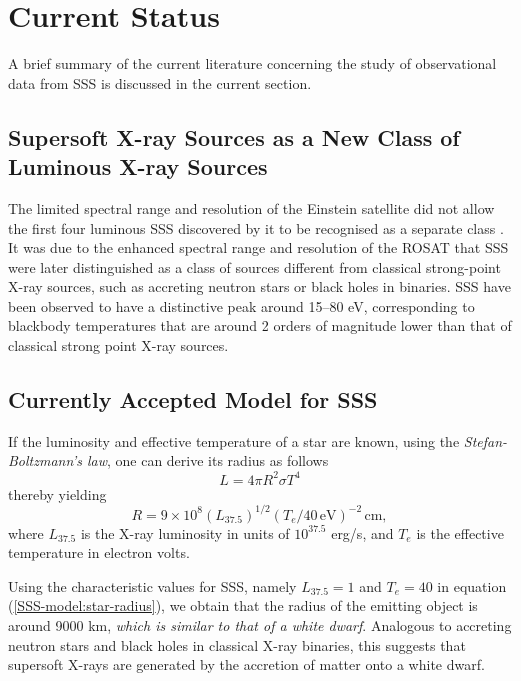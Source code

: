     \section{Current Status} \label{introduction:current_status}
        A brief summary of the current literature concerning the study of observational data from SSS is discussed in the current section.
        
        \subsection{Supersoft X-ray Sources as a New Class of Luminous X-ray Sources} \label{introduction:current_status:new-class}
        	The limited spectral range and resolution of the Einstein satellite did not allow the first four luminous SSS discovered by it to be recognised as a separate class \cite{long81,seward81}. It was due to the enhanced spectral range and resolution of the ROSAT that SSS were later distinguished as a class of sources different from classical strong-point X-ray sources, such as accreting neutron stars or black holes in binaries. SSS have been observed to have a distinctive peak around 15--80 eV, corresponding to blackbody temperatures that are around 2 orders of magnitude lower than that of classical strong point X-ray sources.
        	
        \subsection{Currently Accepted Model for SSS} \label{introduction:current_status:SSS-model}
        	If the luminosity and effective temperature of a star are known, using the \emph{Stefan-Boltzmann's law}, one can derive its radius as follows
        	\begin{equation} \label{SSS-model:stef-boltz}
        		L=4\pi R^2\sigma T^4
        	\end{equation}
        	thereby yielding
        	\begin{equation} \label{SSS-model:star-radius}
        		R=9\times 10^8(L_{37.5})^{1/2}(T_e/40\,\mathrm{eV})^{-2}\,\mathrm{cm,}
        	\end{equation}
        	where $L_{37.5}$ is the X-ray luminosity in units of $10^{37.5}$ erg/s, and $T_e$ is the effective temperature in electron volts.
        	
        	Using the characteristic values for SSS, namely $L_{37.5}=1$ and $T_e=40$ in equation (\ref{SSS-model:star-radius}), we obtain that the radius of the emitting object is around 9000 km, \emph{which is similar to that of a white dwarf}. Analogous to accreting neutron stars and black holes in classical X-ray binaries, this suggests that supersoft X-rays are generated by the accretion of matter onto a white dwarf.
        	
